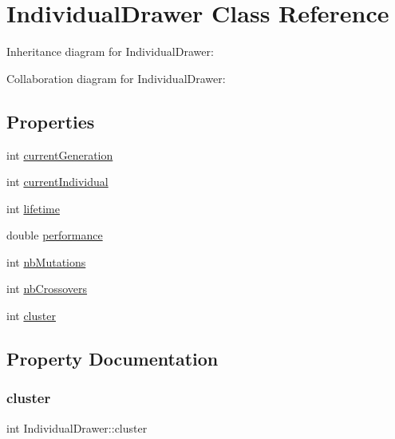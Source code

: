 \hypertarget{class_individual_drawer}{}\section{Individual\+Drawer Class Reference}
\label{class_individual_drawer}


Inheritance diagram for Individual\+Drawer\+:


Collaboration diagram for Individual\+Drawer\+:
\subsection*{Properties}
\begin{DoxyCompactItemize}
\item 
int \hyperlink{class_individual_drawer_aebff3d29013ea6abdefb6e5e14b54c2e}{current\+Generation}
\item 
int \hyperlink{class_individual_drawer_aa8e4b9e5d8b6357fd5dd571dbca04a9d}{current\+Individual}
\item 
int \hyperlink{class_individual_drawer_a006e2962467eea003ae5f00287dc539b}{lifetime}
\item 
double \hyperlink{class_individual_drawer_a7d7dc8a2d50bab0ede8b3c9fad4976ac}{performance}
\item 
int \hyperlink{class_individual_drawer_ac2d3ea0b17000b0c1e23b6a3859bdf4e}{nb\+Mutations}
\item 
int \hyperlink{class_individual_drawer_a9b33f984de4074a35771b8a90ada230e}{nb\+Crossovers}
\item 
int \hyperlink{class_individual_drawer_ad54d843b2fef71c5e24a8f9ee565ee96}{cluster}
\end{DoxyCompactItemize}


\subsection{Property Documentation}
\mbox{\label{class_individual_drawer_ad54d843b2fef71c5e24a8f9ee565ee96}} 
\subsubsection{\texorpdfstring{cluster}{cluster}}
{\footnotesize\ttfamily int Individual\+Drawer\+::cluster}

